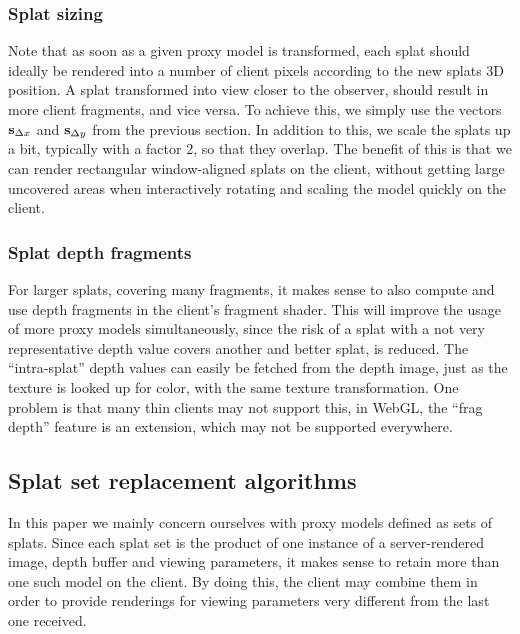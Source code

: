 \subsubsection{Splat sizing}

Note that as soon as a given proxy model is transformed, each splat should
ideally be rendered into a number of client pixels according to the new splats
3D position. A splat transformed into view closer to the observer, should result
in more client fragments, and vice versa. To achieve this, we simply use the
vectors $\mathbf{s}_{\Delta x}$ and $\mathbf{s}_{\Delta y}$ from the previous section.
In addition to this, we scale the splats up a bit, typically with a factor 2, so
that they overlap. The benefit of this is that we can render rectangular
window-aligned splats on the client, without getting large uncovered areas when
interactively rotating and scaling the model quickly on the client.


\subsubsection{Splat depth fragments}

For larger splats, covering many fragments, it makes sense to also compute and
use depth fragments in the client's fragment shader. This will improve the usage
of more proxy models simultaneously, since the risk of a splat with a not very
representative depth value covers another and better splat, is reduced. The
``intra-splat'' depth values can easily be fetched from the depth image, just as
the texture is looked up for color, with the same texture transformation. One
problem is that many thin clients may not support this, in WebGL, the ``frag
depth'' feature is an extension, which may not be supported everywhere.


\subsection{Splat set replacement algorithms}
\label{sec:proxyModelReplacement}

In this paper we mainly concern ourselves with proxy models defined as sets of
splats. Since each splat set is the product of one instance of a server-rendered
image, depth buffer and viewing parameters, it makes sense to retain more than
one such model on the client. By doing this, the client may combine them in
order to provide renderings for viewing parameters very different from the last
one received.

